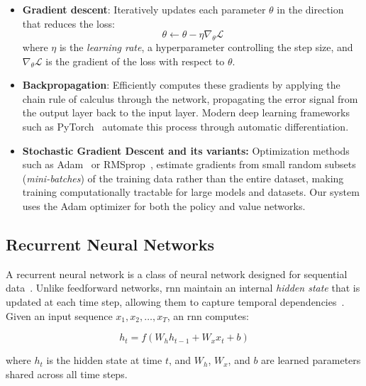 \begin{itemize}
    \item \textbf{Gradient descent}: Iteratively updates each parameter $\theta$ in the direction that reduces the loss:
    \begin{equation}
        \theta \leftarrow \theta - \eta \nabla_\theta \mathcal{L}
    \end{equation}
    where $\eta$ is the \textit{learning rate}, a hyperparameter controlling the step size, and $\nabla_\theta \mathcal{L}$ is the gradient of the loss with respect to $\theta$.
    
    \item \textbf{Backpropagation}: Efficiently computes these gradients by applying the chain rule of calculus through the network, propagating the error signal from the output layer back to the input layer. Modern deep learning frameworks such as PyTorch~\cite{paszke2019pytorch} automate this process through automatic differentiation.
    
    \item \textbf{Stochastic Gradient Descent and its variants:} Optimization methods such as Adam~\cite{kingma2014adam} or RMSprop~\cite{Goodfellow-et-al-2016}, estimate gradients from small random subsets (\textit{mini-batches}) of the training data rather than the entire dataset, making training computationally tractable for large models and datasets. Our system uses the Adam optimizer for both the policy and value networks.
\end{itemize}

\subsection{Recurrent Neural Networks}

A recurrent neural network is a class of neural network designed for sequential data~\cite{Goodfellow-et-al-2016}. Unlike feedforward networks, \gls{rnn} maintain an internal \textit{hidden state} that is updated at each time step, allowing them to capture temporal dependencies~\cite{Goodfellow-et-al-2016}. Given an input sequence $x_1, x_2, \ldots, x_T$, an \gls{rnn} computes:

\begin{equation}
    h_t = f(W_h h_{t-1} + W_x x_t + b)
\end{equation}

where $h_t$ is the hidden state at time $t$, and $W_h$, $W_x$, and $b$ are learned parameters shared across all time steps.

